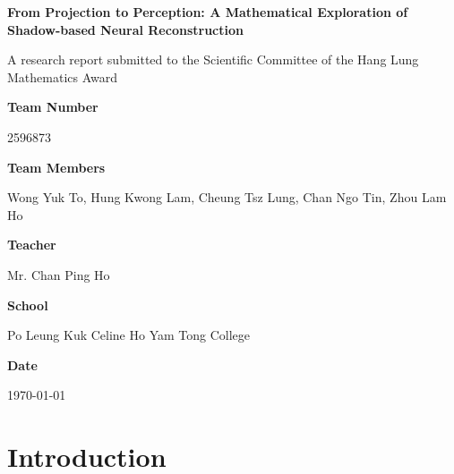 \documentclass[12pt]{article}
\newtheorem{theorem}{Theorem}[section]
\begin{document}
\begin{titlepage}
    \centering
    \vspace*{1cm}
    {\huge \textbf{From Projection to Perception: A Mathematical Exploration of Shadow-based Neural Reconstruction}\par}
    \vspace{1.5cm}
    {\normalsize
    A research report submitted to the Scientific Committee of the Hang Lung Mathematics Award\par}
    \vspace{1cm}
    {\normalsize \textbf{Team Number}\par 2596873\par}
    \vspace{0.5cm}
    {\normalsize \textbf{Team Members}\par Wong Yuk To, Hung Kwong Lam, Cheung Tsz Lung, Chan Ngo Tin, Zhou Lam Ho\par}
    \vspace{0.5cm}
    {\normalsize \textbf{Teacher}\par Mr. Chan Ping Ho\par}
    \vspace{0.5cm}
    {\normalsize \textbf{School}\par Po Leung Kuk Celine Ho Yam Tong College\par}
    \vspace{0.5cm}
    {\normalsize \textbf{Date}\par \today\par}
    \vspace{2cm}

\begin{abstract}
\raggedright %
This paper explores ShadowNeuS [LWX23], a neural network that reconstructs 3D geometry from single-view camera images using shadow and light cues. Unlike traditional 3D reconstruction methods relying on multi-view cameras or sensors, ShadowNeuS leverages a neural signed distance field (SDF) for accurate 3D geometry reconstruction. Analysis of the training process reveals deep connections to projective geometry, spatial reasoning in $\mathbb{R}^3$, and the network's perception of three-dimensional space.
\end{abstract}

\end{titlepage}
\tableofcontents
\newpage

\section{Introduction}
\end{document}
